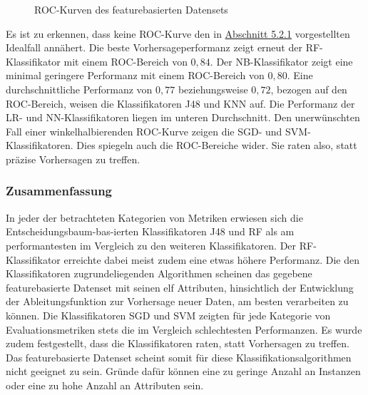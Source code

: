 \begin{figure}[ht]
  \caption{ROC-Kurven des featurebasierten Datensets \label{fig:roc-feat}}
\end{figure}

Es ist zu erkennen, dass keine ROC-Kurve den in \hyperref[roc-def]{Abschnitt 5.2.1} vorgestellten Idealfall annähert. Die beste Vorhersageperformanz zeigt erneut der RF-Klassifikator mit einem ROC-Bereich von $0,84$. Der NB-Klassifikator zeigt eine minimal geringere Performanz mit einem ROC-Bereich von $0,80$. Eine durchschnittliche Performanz von $0,77$ beziehungsweise $0,72$, bezogen auf den ROC-Bereich, weisen die Klassifikatoren J48 und KNN auf. Die Performanz der LR- und NN-Klassifikatoren liegen im unteren Durchschnitt. Den unerwünschten Fall einer winkelhalbierenden ROC-Kurve zeigen die SGD- und SVM-Klassifikatoren. Dies spiegeln auch die ROC-Bereiche wider. Sie \glqq raten\grqq{} also, statt präzise Vorhersagen zu treffen.

\subsubsection*{Zusammenfassung}
In jeder der betrachteten Kategorien von Metriken erwiesen sich die Entscheidungsbaum-bas-ierten Klassifikatoren J48 und RF als am performantesten im Vergleich zu den weiteren Klassifikatoren. Der RF-Klassifikator erreichte dabei meist zudem eine etwas höhere Performanz. Die den Klassifikatoren zugrundeliegenden Algorithmen scheinen das gegebene featurebasierte Datenset mit seinen elf Attributen, hinsichtlich der Entwicklung der Ableitungsfunktion zur Vorhersage neuer Daten, am besten verarbeiten zu können.
Die Klassifikatoren SGD und SVM zeigten für jede Kategorie von Evaluationsmetriken stets die im Vergleich schlechtesten Performanzen. Es wurde zudem festgestellt, dass die Klassifikatoren raten, statt Vorhersagen zu treffen. Das featurebasierte Datenset scheint somit für diese Klassifikationsalgorithmen nicht geeignet zu sein. Gründe dafür können eine zu geringe Anzahl an Instanzen oder eine zu hohe Anzahl an Attributen sein.

